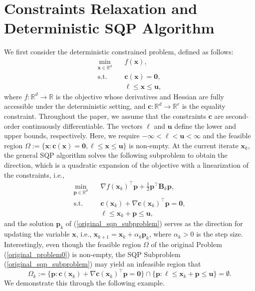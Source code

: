 \documentclass[aos]{imsart}
\numberwithin{equation}{section}
\theoremstyle{plain}
\begin{document}
\section{Constraints Relaxation and Deterministic SQP Algorithm}
\label{sec:constraint_relaxation}
We first consider the deterministic constrained problem, defined as follows:
\begin{equation}
\label{original_det_problem}
    \begin{split}
        \min_{\bm{x} \in \mathbb{R}^{d}} & \hspace{1em} f(\bm{x}), \\
        \text{s.t.} & \hspace{1em} \bm{c}(\bm{x}) = \bm{0},\\
        & \hspace{1em} \bm{\ell} \leq \bm{x} \leq \bm{u},
    \end{split}
\end{equation}
where $f: \mathbb{R}^{d} \to \mathbb{R}$ is the objective whose derivatives and Hessian are fully accessible under the deterministic setting, and  $\bm{c}: \mathbb{R}^{d} \to \mathbb{R}^{r}$ is the equality constraint. Throughout the paper, we assume that the constraints $\bm{c}$ are second-order continuously differentiable. 
The vectors $\bm{\ell}$ and $\bm{u}$ define the lower and upper bounds, respectively.
Here, we require $-\infty < \bm{\ell} < \bm{u} < \infty$ and the feasible region $\Omega := \{\bm{x}: \bm{c}(\bm{x}) = \bm{0}, \bm{\ell} \leq \bm{x} \leq \bm{u}\}$ is non-empty. 
At the current iterate $\bm{x}_k$, the general SQP algorithm solves the following subproblem to obtain the direction, which is a quadratic expansion of the objective with a linearization of the constraints, i.e.,
\begin{equation}
\label{original_sqp_subproblem}
    \begin{split}
        \min_{\bm{p} \in \mathbb{R}^{d}} & \hspace{1em}  \nabla f(\bm{x}_k)^{\top}\bm{p}+ \frac{1}{2}\bm{p}^{\top}\bm{B}_k\bm{p},\\
        \text{s.t.} & \hspace{1em} \bm{c}(\bm{x}_k)+\nabla \bm{c}(\bm{x}_k)^{\top}\bm{p} = \bm{0},\\
        & \hspace{1em} \bm{\ell} \leq \bm{x}_k + \bm{p} \leq \bm{u},
    \end{split}    
\end{equation}
and the solution $\bm{p}_k$ of (\ref{original_sqp_subproblem}) serves as the direction for updating the variable $\bm{x}$, i.e., $\bm{x}_{k+1} = \bm{x}_{k} + \alpha_k \bm{p}_k$, where $\alpha_k >0$ is the step size.
Interestingly, even though the feasible region $\Omega$ of the original Problem (\ref{original_problem0}) is non-empty, the SQP Subproblem (\ref{original_sqp_subproblem}) may yield an infeasible region that
\begin{equation*}
    \Omega_k := \{\bm{p}: \bm{c}(\bm{x}_k)+\nabla \bm{c}(\bm{x}_k)^{\top}\bm{p} = \bm{0}\} \cap \{\bm{p}: \bm{\ell} \leq \bm{x}_k + \bm{p} \leq \bm{u}\} = \emptyset.
\end{equation*}
We demonstrate this through the following example.
\end{document}
